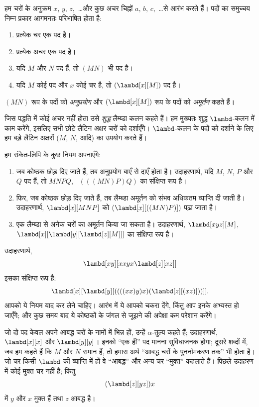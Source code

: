 \documentclass[../../../include/open-logic-section]{subfiles}
\begin{document}

हम चरों के अनुक्रम $x$, $y$, $z$,~\dots और कुछ अचर चिह्नों $a$, $b$,
$c$,~\dots से आरंभ करते हैं। पदों का समुच्चय निम्न प्रकार आगमनतः परिभाषित
होता है:
\begin{enumerate}
\item प्रत्येक चर एक पद है।
\item प्रत्येक अचर एक पद है।
\item यदि $M$ और $N$ पद हैं, तो $(MN)$ भी पद है।
\item यदि $M$ कोई पद और $x$ कोई चर है, तो $(\lambd[x][M])$ पद है।
\end{enumerate}
$(MN)$ रूप के पदों को \emph{अनुप्रयोग} और $(\lambd[x][M])$ रूप के पदों को
\emph{अमूर्तन} कहते हैं।

जिस पद्धति में कोई अचर नहीं होता उसे \emph{शुद्ध} लैम्ब्डा कलन कहते हैं।
हम मुख्यतः शुद्ध $\lambd$-कलन में काम करेंगे, इसलिए सभी छोटे लैटिन अक्षर
चरों को दर्शाएँगे। $\lambd$-कलन के पदों को दर्शाने के लिए हम बड़े लैटिन
अक्षरों ($M$, $N$, आदि) का उपयोग करते हैं।

हम संकेत-लिपि के कुछ नियम अपनाएँगे:

\begin{conv}
\begin{enumerate}
\item जब कोष्ठक छोड़ दिए जाते हैं, तब अनुप्रयोग बाएँ से दाएँ होता है।
  उदाहरणार्थ, यदि $M$, $N$, $P$ और $Q$ पद हैं, तो $MNPQ$, ~$(((MN)P)Q)$
  का संक्षिप्त रूप है।
\item फिर, जब कोष्ठक छोड़ दिए जाते हैं, तब लैम्ब्डा अमूर्तन को संभव
  अधिकतम व्याप्ति दी जाती है। उदाहरणार्थ, $\lambd[x][MNP]$ को
  $(\lambd[x][((MN)P)])$ पढ़ा जाता है।
\item एक लैम्ब्डा से अनेक चरों का अमूर्तन किया जा सकता है। उदाहरणार्थ,
  $\lambd[xyz][M]$, ~$\lambd[x][\lambd[y][\lambd[z][M]]]$ का संक्षिप्त रूप
  है।
\end{enumerate}
\end{conv}

उदाहरणार्थ,
\[
\lambd[xy][xxyx \lambd[z][xz]]
\]
इसका संक्षिप्त रूप है:
\[
\lambd[x][\lambd[y][((((xx)y)x)(\lambd[z][(xz)]))]].
\]
आपको ये नियम याद कर लेने चाहिए। आरंभ में ये आपको चकरा देंगे, किंतु आप इनके
अभ्यस्त हो जाएँगे; और कुछ समय बाद ये कोष्ठकों के जंगल से जूझने की अपेक्षा
कम परेशान करेंगे।

जो दो पद केवल अपने आबद्ध चरों के नामों में भिन्न हों, उन्हें
$\alpha$-तुल्य कहते हैं; उदाहरणार्थ, $\lambd[x][x]$ और $\lambd[y][y]$।
इनको ``एक ही'' पद मानना सुविधाजनक होगा; दूसरे शब्दों में, जब हम कहते हैं
कि $M$ और $N$ समान हैं, तो हमारा अर्थ ``आबद्ध चरों के पुनर्नामकरण तक'' भी
होता है। जो चर किसी $\lambd$ की व्याप्ति में हों वे ``आबद्ध'' और अन्य चर
``मुक्त'' कहलाते हैं। पिछले उदाहरण में कोई मुक्त चर नहीं है; किंतु
\[
(\lambd[z][yz])x
\]
में $y$ और $x$ मुक्त हैं तथा $z$ आबद्ध है।
\end{document}
